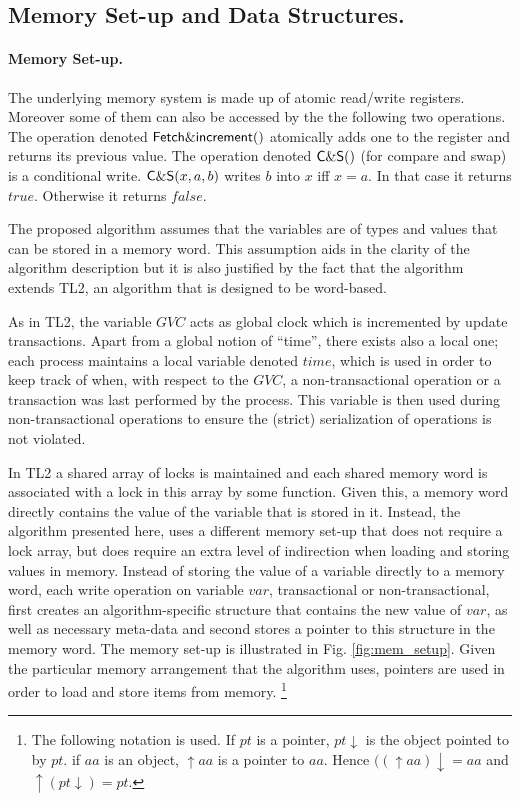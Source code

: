 \subsection{Memory Set-up and Data Structures.}


\paragraph{Memory Set-up.}
The underlying memory system is made up of atomic read/write registers. 
Moreover some of them can also be accessed by the the following two 
operations. The operation denoted 
${\sf Fetch\&increment}()$ atomically adds one to the register and 
returns its previous value. 
 The operation denoted 
${\sf C\&S}()$ (for compare and swap) is a conditional write. 
${\sf C\&S}(x,a,b)$ writes $b$ into $x$ iff $x=a$. In that case it 
returns $\mathit{true}$. Otherwise it returns  $\mathit{false}$. 


The proposed algorithm assumes that the
variables  are  of  types and  values  that  can  be   stored in  a  memory
word. This assumption aids in the clarity of the algorithm description  
but it  is also  justified by the  fact that  the algorithm extends  TL2, an
algorithm that is   designed to be word-based. 

As in TL2,  the variable $\mathit{GVC}$
acts as  global  clock  which  is incremented  by update transactions.
 Apart from a global   notion of ``time'', there exists also
a local one; each process maintains a local  
variable denoted $\mathit{time}$,  which is used in order to keep  
track of when, with
respect to the $\mathit{GVC}$, a non-transactional operation 
or a transaction was last performed by
the  process.
This variable is then used during non-transactional operations to ensure
the (strict) serialization of operations is not violated.

In TL2 a  shared array of locks is maintained and each
shared memory word  
is associated with a lock in this array by some function. Given this, a memory
word directly contains  
the value of the variable that  is stored in it.
Instead, the algorithm presented here, uses
a  different memory set-up that does not require a lock array, but does require
an extra level of indirection when loading and storing values in memory.
Instead of storing the value of a variable directly to a memory word,
each  write  operation  on  variable  $\mathit{var}$,   transactional  or
non-transactional, first creates an algorithm-specific   
structure that contains the new value of  $\mathit{var}$, as
well as necessary meta-data and second stores a pointer to this structure in the memory word.
The memory set-up  is illustrated in Fig.  \ref{fig:mem_setup}.
Given the particular memory arrangement  that the algorithm uses,
pointers are used in order to load and store items from memory.
\footnote{The following  notation  is
used. If $pt$ is a pointer, $pt\downarrow$ is the object pointed to by $pt$. 
if $aa$ is an object, $\uparrow aa$ is a pointer to $aa$. Hence 
$((\uparrow aa)\downarrow =aa$ and $ \uparrow(pt \downarrow)=pt$.}


